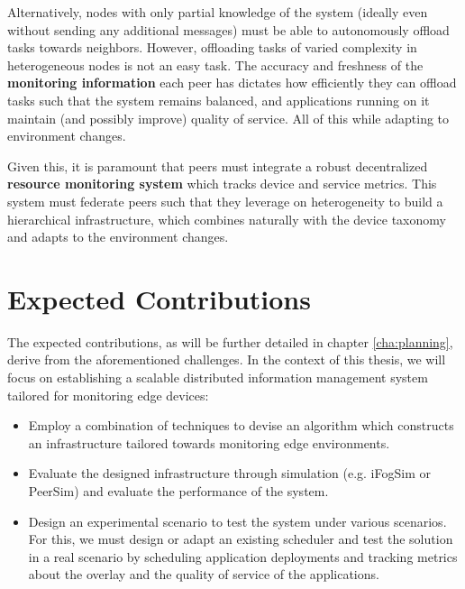 Alternatively, nodes with only partial knowledge of the system (ideally even without sending any additional messages) must be able to autonomously offload tasks towards neighbors. However, offloading tasks of varied complexity in heterogeneous nodes is not an easy task. The accuracy and freshness of the \textbf{monitoring information} each peer has dictates how efficiently they can offload tasks such that the system remains balanced, and applications running on it maintain (and possibly improve) quality of service. All of this while adapting to environment changes. 

Given this, it is paramount that peers must integrate a robust decentralized \textbf{resource monitoring system} which tracks device and service metrics. This system must federate peers such that they leverage on heterogeneity to build a hierarchical infrastructure, which combines naturally with the device taxonomy and adapts to the environment changes. 

\section{Expected Contributions}

The expected contributions, as will be further detailed in chapter \ref{cha:planning}, derive from the aforementioned challenges. In the context of this thesis, we will focus on establishing a scalable distributed information management system tailored for monitoring edge devices:

\begin{itemize}

    \item Employ a combination of techniques to devise an algorithm which constructs an infrastructure tailored towards monitoring edge environments.
    
    \item Evaluate the designed infrastructure through simulation (e.g. iFogSim or PeerSim) and evaluate the performance of the system.

    \item Design an experimental scenario to test the system under various scenarios. For this, we must design or adapt an existing scheduler and test the solution in a real scenario by scheduling application deployments and tracking metrics about the overlay and the quality of service of the applications.
    
\end{itemize}

